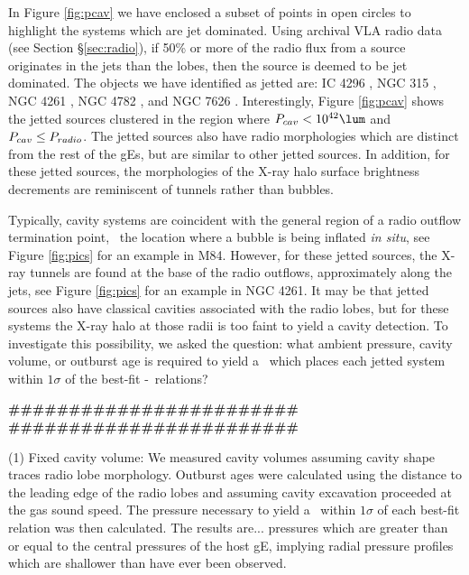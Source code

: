 \documentclass{emulateapj}
\begin{document}
In Figure \ref{fig:pcav} we have enclosed a subset of points in open
circles to highlight the systems which are jet dominated. Using
archival VLA radio data (see Section \S\ref{sec:radio}), if 50\% or
more of the radio flux from a source originates in the jets than the
lobes, then the source is deemed to be jet dominated. The objects we
have identified as jetted are: IC 4296 \citep{2003ApJ...585..677P},
NGC 315 \citep{1979ApJ...228L...9B, 1981A&A....95..250W}, NGC 4261
\citep{1997ApJ...484..186J, 2000ApJ...534..165J}, NGC 4782
\citep{2007ApJ...664..804M}, and NGC 7626
\citep{1985ApJ...291...32B}. Interestingly, Figure \ref{fig:pcav}
shows the jetted sources clustered in the region where $\pcav <
10^{42} \lum$ and $P_{cav} \le P_{radio}$. The jetted sources also have
radio morphologies which are distinct from the rest of the gEs, but
are similar to other jetted sources. In addition, for these jetted
sources, the morphologies of the X-ray halo surface brightness
decrements are reminiscent of tunnels rather than bubbles.

Typically, cavity systems are coincident with the general region of a
radio outflow termination point, \ie\ the location where a bubble is
being inflated {\it{in situ}}, see Figure \ref{fig:pics} for an
example in M84. However, for these jetted sources, the X-ray tunnels
are found at the base of the radio outflows, approximately along the
jets, see Figure \ref{fig:pics} for an example in NGC 4261. It may be
that jetted sources also have classical cavities associated with the
radio lobes, but for these systems the X-ray halo at those radii is
too faint to yield a cavity detection. To investigate this
possibility, we asked the question: what ambient pressure, cavity
volume, or outburst age is required to yield a \pcav\ which places
each jetted system within $1\sigma$ of the best-fit
\pcav-\prad\ relations?

{\bfseries{\#\#\#\#\#\#\#\#\#\#\#\#\#\#\#\#\#\#\#\#\#\#\#\#}}\\
{\bfseries{\#\#\#\#\#\#\#\#\#\#\#\#\#\#\#\#\#\#\#\#\#\#\#\#}}

(1) Fixed cavity volume: We measured cavity volumes assuming cavity
shape traces radio lobe morphology. Outburst ages were calculated
using the distance to the leading edge of the radio lobes and assuming
cavity excavation proceeded at the gas sound speed. The pressure
necessary to yield a \pcav\ within $1\sigma$ of each best-fit relation
was then calculated. The results are... pressures which are greater
than or equal to the central pressures of the host gE, implying radial
pressure profiles which are shallower than have ever been observed.
\end{document}
